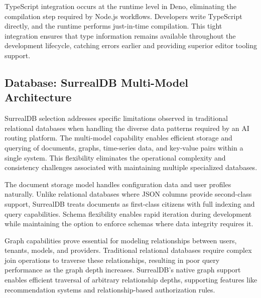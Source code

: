 \documentclass[12pt,a4paper,twoside]{report}
\begin{document}
TypeScript integration occurs at the runtime level in Deno, eliminating the compilation step required by Node.js workflows. Developers write TypeScript directly, and the runtime performs just-in-time compilation. This tight integration ensures that type information remains available throughout the development lifecycle, catching errors earlier and providing superior editor tooling support.

\subsection{Database: SurrealDB Multi-Model Architecture}

SurrealDB selection addresses specific limitations observed in traditional relational databases when handling the diverse data patterns required by an AI routing platform. The multi-model capability enables efficient storage and querying of documents, graphs, time-series data, and key-value pairs within a single system. This flexibility eliminates the operational complexity and consistency challenges associated with maintaining multiple specialized databases.

The document storage model handles configuration data and user profiles naturally. Unlike relational databases where JSON columns provide second-class support, SurrealDB treats documents as first-class citizens with full indexing and query capabilities. Schema flexibility enables rapid iteration during development while maintaining the option to enforce schemas where data integrity requires it.

Graph capabilities prove essential for modeling relationships between users, tenants, models, and providers. Traditional relational databases require complex join operations to traverse these relationships, resulting in poor query performance as the graph depth increases. SurrealDB's native graph support enables efficient traversal of arbitrary relationship depths, supporting features like recommendation systems and relationship-based authorization rules.
\end{document}
